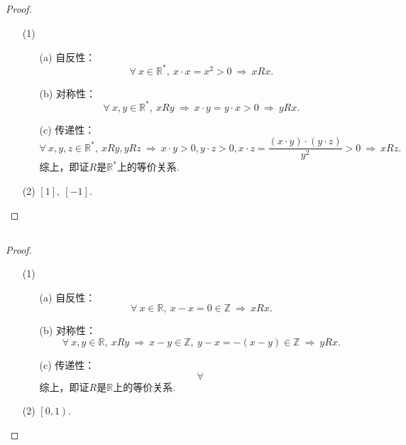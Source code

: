 \documentclass[UTF8]{ctexart}
\begin{document}
\subsection{}   %
\begin{proof}
    \begin{enumerate}
        \item []
        \item [(1)]
        \begin{enumerate}
            \item [(a)]自反性：
            \[
                \forall\ x\in \mathbb{R}^* ,\ x\cdot x = x^2 >0
                \ \Rightarrow\ 
                xRx.    
            \]
            \item [(b)]对称性：
            \[
                \forall\ x,y\in \mathbb{R}^*,\ xRy
                \ \Rightarrow\ 
                x\cdot y = y \cdot x >0
                \ \Rightarrow\ 
                yRx.
            \]
            \item [(c)]传递性：
            \[
                \forall\ x,y,z\in \mathbb{R}^*,\ xRy,yRz
                \ \Rightarrow\ 
                x\cdot y>0, y\cdot z>0, x\cdot z=\frac{(x\cdot y)\cdot (y\cdot z)}{y^2}>0   
                \ \Rightarrow\ 
                xRz.
            \]
            综上，即证$R$是$\mathbb{R}^*$上的等价关系.
        \end{enumerate}
        \item [(2)]$[1],\ [-1]$.
    \end{enumerate}
\end{proof}

\subsection{}   %
\begin{proof}
    \begin{enumerate}
        \item []
        \item [(1)]
        \begin{enumerate}
            \item [(a)]自反性：
            \[
                \forall\ x\in \mathbb{R},\ x-x=0\in \mathbb{Z}
                \ \Rightarrow\ 
                xRx.
            \]
            \item [(b)]对称性：
            \[
                \forall\ x,y\in \mathbb{R},\ xRy
                \ \Rightarrow\ 
                x-y\in \mathbb{Z},\ y-x=-(x-y)\in \mathbb{Z}
                \ \Rightarrow\ 
                yRx.
            \]
            \item [(c)]传递性：
            \[
                \forall\ 
            \]
            综上，即证$R$是$\mathbb{R}$上的等价关系.
        \end{enumerate}
        \item [(2)]$\left[0,1\right)$.
    \end{enumerate}
\end{proof}
\end{document}
